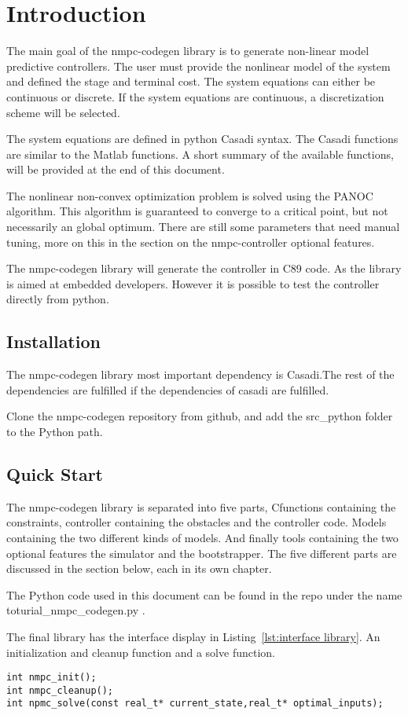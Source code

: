 \section{Introduction}
The main goal of the nmpc-codegen library is to generate non-linear model predictive controllers. The user must provide the nonlinear model of the system and defined the stage and terminal cost. The system equations can either be continuous or discrete. If the system equations are continuous, a discretization scheme will be selected.

The system equations are defined in python Casadi syntax. The Casadi functions are similar to the Matlab functions. A short summary of the available functions, will be provided at the end of this document.

The nonlinear non-convex optimization problem is solved using the PANOC algorithm. This algorithm is guaranteed to converge to a critical point, but not necessarily an global optimum. There are still some parameters that need manual tuning, more on this in the section on the nmpc-controller optional features.

The nmpc-codegen library will generate the controller in C89 code. As the library is aimed at embedded developers. However it is possible to test the controller directly from python.

\subsection{Installation}
The nmpc-codegen library most important dependency is Casadi.The rest of the dependencies are fulfilled if the dependencies of casadi are fulfilled.

Clone the nmpc-codegen repository from github, and add the src\_python folder to the Python path.

\subsection{Quick Start}
The nmpc-codegen library is separated into five parts, Cfunctions containing the constraints, controller containing the obstacles and the controller code. Models containing the two different kinds of models. And finally tools containing the two optional features the simulator and the bootstrapper. The five different parts are discussed in the section below, each in its own chapter.

The Python code used in this document can be found in the repo under the name toturial\_nmpc\_codegen.py .

The final library has the interface display in Listing~\ref{lst:interface library}. An initialization and cleanup function and a solve function.

\begin{lstlisting}[caption={interface library},captionpos=b,label={lst:interface library}]
int nmpc_init();
int nmpc_cleanup();
int npmc_solve(const real_t* current_state,real_t* optimal_inputs);
\end{lstlisting}